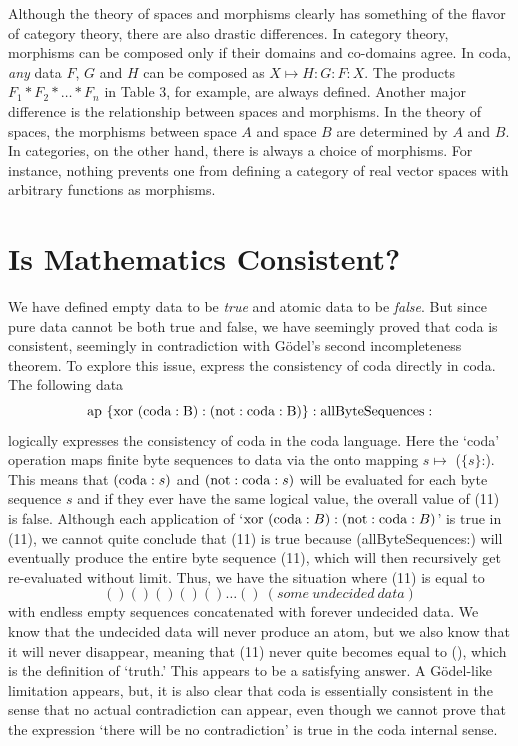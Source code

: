 \documentclass[11pt]{article}
\begin{document}
    Although the theory of spaces and morphisms clearly has something of the flavor of category theory, there are
also drastic differences.  In category theory, morphisms can be composed only if their domains and co-domains
agree.  In coda, {\it any} data $F$, $G$ and $H$ can be composed as 
$X\mapsto H:G:F:X$.  The products $F_1*F_2*\dots *F_n$ in Table 3,
for example, are always defined.  Another major difference
is the relationship between spaces and morphisms.  In the theory of spaces, the morphisms between space
$A$ and space $B$ are determined by $A$ and $B$.  In categories, on the other hand, there is always a choice of morphisms.  
For instance, nothing prevents one from defining a category
of real vector spaces with arbitrary functions as morphisms.  

\section{Is Mathematics Consistent?}

     We have defined empty data to be {\it true} and atomic data to be {\it false}.  But since pure data
cannot be both true and false, we have seemingly proved that coda is consistent, seemingly
in contradiction with G\"{o}del's second incompleteness theorem.  To explore this issue,
express the consistency of coda directly in coda.  The following data
\begin{equation}\label{eqn}
{\rm ap\ \{xor\ (coda:B) : (not:coda:B) \} : allByteSequences :}
\end{equation}
logically expresses the consistency of coda in the coda language.  Here the `coda' operation maps
finite byte sequences to data via the onto mapping $s\mapsto$ ($\{s\}$:).  This means that $({\rm coda}:s)$ and
$({\rm not}:{\rm coda}:s)$ will be evaluated for each byte sequence $s$ and if they ever have the same logical
value, the overall value of (11) is false.   Although each application of `${\rm xor}\ ({\rm coda}:B) : ({\rm not}:{\rm coda}:B)$'
is true in (11), we cannot quite conclude that (11) is true because (allByteSequences:) will
eventually produce the entire byte sequence (11), which will then recursively get re-evaluated
without limit.  Thus, we have the situation where (11) is equal to
\begin{equation}\label{eqn}
() () () () () \dots ()\  (some\ undecided\ data)
\end{equation}
with endless empty sequences concatenated with forever undecided data.
We know that the undecided data will never produce an atom, but we also know that it will never disappear,
meaning that (11) never quite becomes equal to (), which is the definition of `truth.'  This appears
to be a satisfying answer.  A G\"{o}del-like limitation appears, but, it is also clear that coda
is essentially consistent in the sense that no actual contradiction can appear, even though we
cannot prove that the expression `there will be no contradiction' is true in the coda internal sense.
\end{document}
